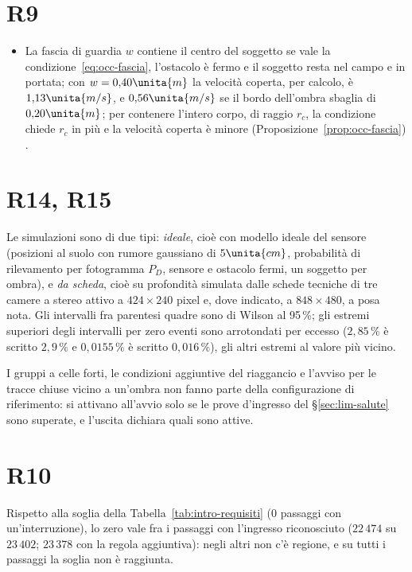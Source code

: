 \section*{R9}
\begin{itemize}
\item La fascia di guardia $w$ contiene il centro del soggetto se vale la condizione~\eqref{eq:occ-fascia}, l'ostacolo è fermo e il soggetto resta nel campo e in portata; con $w=0{,}40\unita{m}$ la velocità coperta, per calcolo, è $1{,}13\unita{m/s}$, e $0{,}56\unita{m/s}$ se il bordo dell'ombra sbaglia di $0{,}20\unita{m}$; per contenere l'intero corpo, di raggio $r_c$, la condizione chiede $r_c$ in più e la velocità coperta è minore (Proposizione~\ref{prop:occ-fascia}) .
\end{itemize}
\section*{R14, R15}
Le simulazioni sono di due tipi: \emph{ideale}, cioè con modello ideale del sensore (posizioni al suolo con rumore gaussiano di $5\unita{cm}$, probabilità di rilevamento per fotogramma $P_D$, sensore e ostacolo fermi, un soggetto per ombra), e \emph{da scheda}, cioè su profondità simulata dalle schede tecniche di tre camere a stereo attivo a $424\times240$ pixel e, dove indicato, a $848\times480$, a posa nota. Gli intervalli fra parentesi quadre sono di Wilson al 95\,\%; gli estremi superiori degli intervalli per zero eventi sono arrotondati per eccesso ($2{,}85\,\%$ è scritto $2{,}9\,\%$ e $0{,}0155\,\%$ è scritto $0{,}016\,\%$), gli altri estremi al valore più vicino.

I gruppi a celle forti, le condizioni aggiuntive del riaggancio e l'avviso per le tracce chiuse vicino a un'ombra non fanno parte della configurazione di riferimento: si attivano all'avvio solo se le prove d'ingresso del \S\ref{sec:lim-salute} sono superate, e l'uscita dichiara quali sono attive.
\section*{R10}
Rispetto alla soglia della Tabella~\ref{tab:intro-requisiti} (0 passaggi con un'interruzione), lo zero vale fra i passaggi con l'ingresso riconosciuto ($22\,474$ su $23\,402$; $23\,378$ con la regola aggiuntiva): negli altri non c'è regione, e su tutti i passaggi la soglia non è raggiunta.
